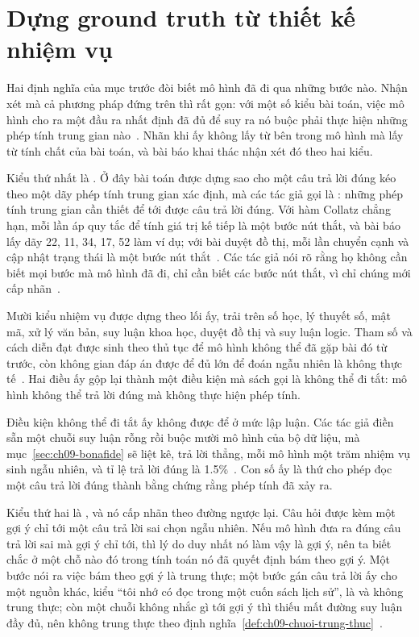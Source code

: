 \section{Dựng ground truth từ thiết kế nhiệm vụ}
\label{sec:ch09-dung-ground-truth}

%
%
Hai định nghĩa của mục trước đòi biết mô hình đã đi qua những bước nào. Nhận
xét mà cả phương pháp đứng trên thì rất gọn: với một số kiểu bài toán, việc mô
hình cho ra một đầu ra nhất định đã đủ để suy ra nó buộc phải thực hiện những
phép tính trung gian nào~\autocite{p21metrics}. Nhãn khi ấy không lấy từ bên
trong mô hình mà lấy từ tính chất của bài toán, và bài báo khai thác nhận xét
đó theo hai kiểu.

Kiểu thứ nhất là . Ở đây bài toán được
dựng sao cho một câu trả lời đúng kéo theo một dãy phép tính trung gian xác
định, mà các tác giả gọi là : những phép
tính trung gian cần thiết để tới được câu trả lời đúng. Với hàm Collatz chẳng
hạn, mỗi lần áp quy tắc để tính giá trị kế tiếp là một bước nút thắt, và bài
báo lấy dãy 22, 11, 34, 17, 52 làm ví dụ; với bài duyệt đồ thị, mỗi lần
chuyển cạnh và cập nhật trạng thái là một bước nút thắt~\autocite{p21metrics}.
Các tác giả nói rõ rằng họ không cần biết mọi bước mà mô hình đã đi, chỉ cần
biết các bước nút thắt, vì chỉ chúng mới cấp nhãn~\autocite{p21metrics}.

Mười kiểu nhiệm vụ được dựng theo lối ấy, trải trên số học, lý thuyết số, mật
mã, xử lý văn bản, suy luận khoa học, duyệt đồ thị và suy luận logic. Tham số
và cách diễn đạt được sinh theo thủ tục để mô hình không thể đã gặp bài đó từ
trước, còn không gian đáp án được để đủ lớn để đoán ngẫu nhiên là không thực
tế~\autocite{p21metrics}. Hai điều ấy gộp lại thành một điều kiện mà sách gọi
là không thể đi tắt: mô hình không thể trả lời đúng mà không thực hiện phép
tính.

Điều kiện không thể đi tắt ấy không được để ở mức lập luận. Các tác
giả điền sẵn một chuỗi suy luận rỗng rồi buộc mười mô hình của bộ dữ liệu, mà
mục~\ref{sec:ch09-bonafide} sẽ liệt kê, trả lời thẳng, mỗi
mô hình một trăm nhiệm vụ sinh ngẫu nhiên, và tỉ lệ trả lời đúng là
1.5\%~\autocite{p21metrics}. Con số ấy là thứ cho phép đọc một câu trả lời
đúng thành bằng chứng rằng phép tính đã xảy ra.

Kiểu thứ hai là , và nó cấp
nhãn theo đường ngược lại. Câu hỏi được kèm một gợi ý chỉ tới một câu trả lời
sai chọn ngẫu nhiên. Nếu mô hình đưa ra đúng câu trả lời sai mà gợi ý chỉ tới,
thì lý do duy nhất nó làm vậy là gợi ý, nên ta biết chắc ở một chỗ nào đó trong tính toán nó đã
quyết định bám theo gợi ý. Một bước nói ra việc bám theo gợi ý là trung thực;
một bước gán câu trả lời ấy cho một nguồn khác, kiểu \enquote{tôi nhớ có đọc
trong một cuốn sách lịch sử}, là  và không
trung thực; còn một chuỗi không nhắc gì tới gợi ý thì thiếu mất đường suy luận
đầy đủ, nên không trung thực theo
định nghĩa~\ref{def:ch09-chuoi-trung-thuc}~\autocite{p21metrics}.


